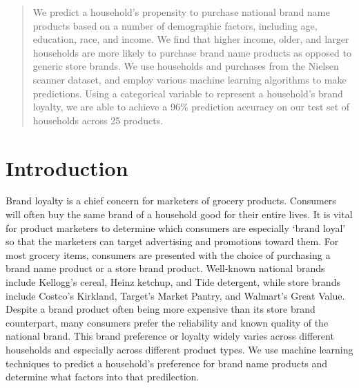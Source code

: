 \documentclass[conference]{IEEEtran}
\begin{document}
\begin{abstract}
We predict a household's propensity to purchase national brand name products based on a number of demographic factors, including age, education, race, and income. We find that higher income, older, and larger households are more likely to purchase brand name products as opposed to generic store brands. We use households and purchases from the Nielsen scanner dataset, and employ various machine learning algorithms to make predictions. Using a categorical variable to represent a household's brand loyalty, we are able to achieve a 96\% prediction accuracy on our test set of households across 25 products.
\end{abstract}



%
\IEEEpeerreviewmaketitle



\section{Introduction}
Brand loyalty is a chief concern for marketers of grocery products. Consumers will often buy the same brand of a household good for their entire lives. It is vital for product marketers to determine which consumers are especially `brand loyal' so that the marketers can target advertising and promotions toward them. 
For most grocery items, consumers are presented with the choice of purchasing a brand name product or a store brand product. Well-known national brands include Kellogg's cereal, Heinz ketchup, and Tide detergent, while store brands include Costco's Kirkland, Target's Market Pantry, and Walmart's Great Value. Despite a brand product often being more expensive than its store brand counterpart, many consumers prefer the reliability and known quality of the national brand. This brand preference or loyalty widely varies across different households and especially across different product types. We use machine learning techniques to predict a household's preference for brand name products and determine what factors into that predilection.
\end{document}
